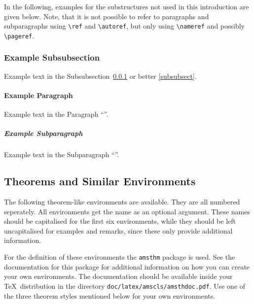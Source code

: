 \documentclass{eceasst}
\begin{document}
In the following, examples for the substructures not used in this introduction
are given below.
Note, that it is not possible to refer to paragraphs and subparagraphs using
\verb|\ref| and \verb|\autoref|, but only using \verb|\nameref| and possibly
\verb|\pageref|.

\subsubsection{Example Subsubsection}\label{subsubsect}
Example text in the Subsubsection~\ref{subsubsect} or better
\autoref{subsubsect}.
\paragraph{Example Paragraph}\label{para}
Example text in the Paragraph ``''.
\subparagraph{Example Subparagraph}\label{subpara}
Example text in the Subparagraph ``''.

\subsection{Theorems and Similar Environments}\label{theorems}
The following theorem-like environments are available.
They are all numbered seperately.
All environments get the name as an optional argument.
These names should be capitalised for the first six environments, while they
should be left uncapitalised for examples and remarks, since these only provide
additional information.

For the definition of these environments the \verb|amsthm| package is used.
See the documentation for this package for additional information on how you
can create your own environments.
The documentation should be available inside your \TeX\ distribution in the
directory \verb|doc/latex/amscls/amsthdoc.pdf|.
Use one of the three theorem styles mentioned below for your own environments.
\end{document}
